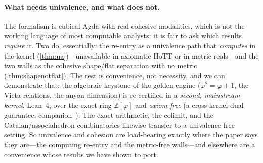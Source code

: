 \documentclass[11pt,letterpaper]{article}
\theoremstyle{plain}
\theoremstyle{definition}
\theoremstyle{remark}
\newcommand{\ZZ}{\mathbb{Z}}
\newcommand{\Zphi}{\ZZ[\varphi]}
\begin{document}
\paragraph{What needs univalence, and what does not.}
The formalism is cubical Agda with real-cohesive modalities, which is not the working
language of most computable analysts; it is fair to ask which results \emph{require} it.
Two do, essentially: the re-entry as a univalence path that \emph{computes} in the kernel
(\cref{thm:ua})---unavailable in axiomatic HoTT or in metric reals---and the two walls as
the cohesive shape/flat separation with no metric (\cref{thm:shapenotflat}). The rest is
convenience, not necessity, and we can demonstrate that: the algebraic keystone of the
golden engine ($\varphi^2=\varphi+1$, the Vieta relations, the anyon dimension) is
re-certified in a \emph{second, mainstream kernel}, Lean~4, over the exact ring $\Zphi$
and \emph{axiom-free} (a cross-kernel dual guarantee; companion~\citep{iaom_wheel}). The exact
arithmetic, the colimit, and the Catalan/associahedron combinatorics likewise transfer to
a univalence-free setting. So univalence and cohesion are load-bearing exactly where the
paper says they are---the computing re-entry and the metric-free walls---and elsewhere are
a convenience whose results we have shown to port.
\end{document}
